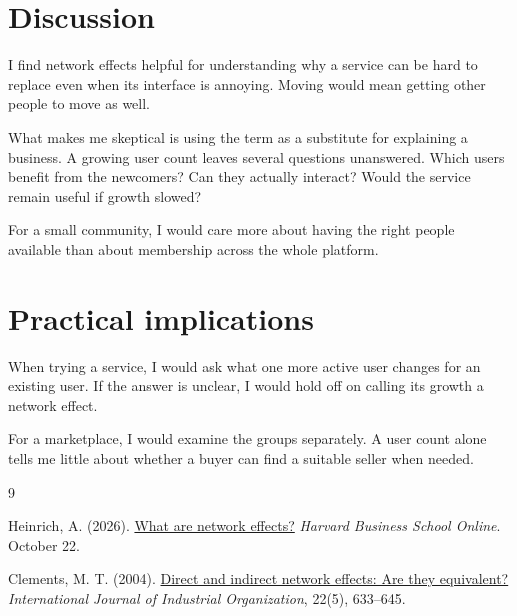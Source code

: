 \documentclass[11pt,a4paper]{article}
\begin{document}
\section{Discussion}

I find network effects helpful for understanding why a service can be
hard to replace even when its interface is annoying. Moving would mean
getting other people to move as well.

What makes me skeptical is using the term as a substitute for explaining
a business. A growing user count leaves several questions unanswered.
Which users benefit from the newcomers? Can they actually interact?
Would the service remain useful if growth slowed?

For a small community, I would care more about having the right people
available than about membership across the whole platform.

\section{Practical implications}

When trying a service, I would ask what one more active user changes for
an existing user. If the answer is unclear, I would hold off on calling
its growth a network effect.

For a marketplace, I would examine the groups separately. A user count
alone tells me little about whether a buyer can find a suitable seller
when needed.

\renewcommand{\refname}{References}
\begin{thebibliography}{9}
\small
\setlength{\itemsep}{0.35em}

Heinrich, A. (2026).
\href{https://online.hbs.edu/blog/post/what-are-network-effects}
{What are network effects?}
\textit{Harvard Business School Online}. October 22.

Clements, M. T. (2004).
\href{https://doi.org/10.1016/j.ijindorg.2004.01.003}
{Direct and indirect network effects: Are they equivalent?}
\textit{International Journal of Industrial Organization}, 22(5), 633--645.

\end{thebibliography}
\end{document}
